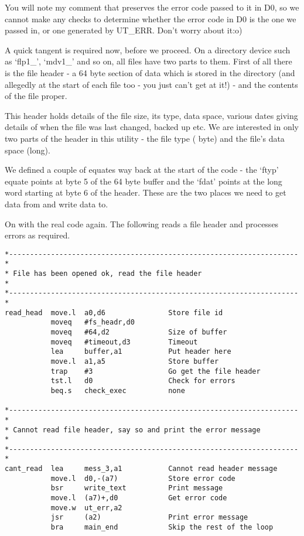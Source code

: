 You will note my comment that  preserves the error code passed
    to it in D0, so we cannot make any checks to determine whether the error
    code in D0 is the one we passed in, or one generated by UT\_ERR. Don't
    worry about it:o)

A quick tangent is required now, before we proceed. On a directory
    device such as `flp1\_', `mdv1\_' and so on, all files have two parts to
    them. First of all there is the file header -{} a 64 byte section of data
    which is stored in the directory (and allegedly at the start of each file
    too -{} you just can't get at it!) -{} and the contents of the file
    proper.

This header holds details of the file size, its type, data space,
    various dates giving details of when the file was last changed, backed up
    etc. We are interested in only two parts of the header in this utility -{}
    the file type ( byte) and the file's data space (long).

We defined a couple of equates way back at the start of the code -{}
    the `ftyp' equate points at byte 5 of the 64 byte buffer and the `fdat'
    points at the long word starting at byte 6 of the header. These are the
    two places we need to get data from and write data to.

On with the real code again. The following reads a file header and
    processes errors as required.

\begin{lstlisting}[firstnumber=last,caption={Dataspace Program - Part 4 - Read File Header}]
*---------------------------------------------------------------------*
* File has been opened ok, read the file header                       *
*---------------------------------------------------------------------*
read_head  move.l  a0,d6               Store file id
           moveq   #fs_headr,d0
           moveq   #64,d2              Size of buffer
           moveq   #timeout,d3         Timeout
           lea     buffer,a1           Put header here
           move.l  a1,a5               Store buffer
           trap    #3                  Go get the file header
           tst.l   d0                  Check for errors
           beq.s   check_exec          none

*---------------------------------------------------------------------*
* Cannot read file header, say so and print the error message         *
*---------------------------------------------------------------------*
cant_read  lea     mess_3,a1           Cannot read header message
           move.l  d0,-(a7)            Store error code
           bsr     write_text          Print message
           move.l  (a7)+,d0            Get error code
           move.w  ut_err,a2
           jsr     (a2)                Print error message
           bra     main_end            Skip the rest of the loop
\end{lstlisting}

